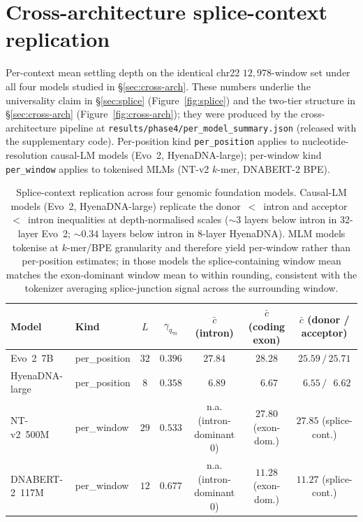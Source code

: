 \documentclass{article}
\theoremstyle{plain}
\theoremstyle{definition}
\theoremstyle{remark}
\begin{document}
\section{Cross-architecture splice-context replication}
\label{app:cross-arch}

Per-context mean settling depth on the identical chr22
$12{,}978$-window set under all four models studied in
\S\ref{sec:cross-arch}. These numbers underlie the universality claim
in \S\ref{sec:splice} (Figure~\ref{fig:splice}) and the two-tier
structure in \S\ref{sec:cross-arch} (Figure~\ref{fig:cross-arch}); they
were produced by the cross-architecture pipeline at
\texttt{results/phase4/per\_model\_summary.json} (released with the
supplementary code). Per-position kind \texttt{per\_position} applies
to nucleotide-resolution causal-LM models (Evo~2, HyenaDNA-large);
per-window kind \texttt{per\_window} applies to tokenised MLMs
(NT-v2 $k$-mer, DNABERT-2 BPE).

\begin{table}[h]
\caption{Splice-context replication across four genomic foundation
models. Causal-LM models (Evo~2, HyenaDNA-large) replicate the
donor~$<$~intron and acceptor~$<$~intron inequalities at
depth-normalised scales ($\sim 3$ layers below intron in 32-layer
Evo~2; $\sim 0.34$ layers below intron in 8-layer HyenaDNA). MLM
models tokenise at $k$-mer/BPE granularity and therefore yield
per-window rather than per-position estimates; in those models the
splice-containing window mean matches the exon-dominant window mean to
within rounding, consistent with the tokenizer averaging splice-junction
signal across the surrounding window.}
\label{tab:cross-arch-context}
\centering
\footnotesize
\setlength{\tabcolsep}{4pt}
\begin{tabular}{@{}llccccc@{}}
\toprule
Model & Kind & $L$ & $\gamma_{q_{70}}$
   & $\bar c$ (intron) & $\bar c$ (coding exon)
   & $\bar c$ (donor / acceptor) \\
\midrule
Evo~2~7B            & per\_position & $32$ & $0.396$
   & $27.84$ & $28.28$ & $25.59 \,/\, 25.71$ \\
HyenaDNA-large      & per\_position & $8$  & $0.358$
   & $\phantom{0}6.89$ & $\phantom{0}6.67$
   & $\phantom{0}6.55 \,/\, \phantom{0}6.62$ \\
NT-v2~500M          & per\_window   & $29$ & $0.533$
   & n.a. (intron-dominant 0)
   & $27.80$ (exon-dom.) & $27.85$ (splice-cont.) \\
DNABERT-2~117M      & per\_window   & $12$ & $0.677$
   & n.a. (intron-dominant 0)
   & $11.28$ (exon-dom.) & $11.27$ (splice-cont.) \\
\bottomrule
\end{tabular}
\end{table}
\end{document}
